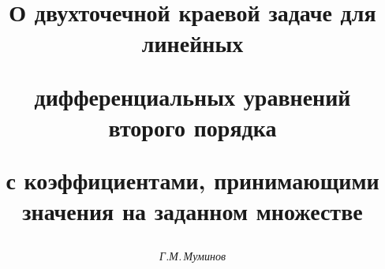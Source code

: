 

 


% 


 


\newcommand{\la}{\langle} 


\newcommand{\ra}{\rangle} 


\newcommand{\tg}{\operatorname{tg}} 


\newcommand{\arctg}{\operatorname{arctg}} 


\newcommand{\diag}{\operatorname{diag}} 


\newcommand{\tts}[1]{} 


\renewcommand{\baselinestretch}{1.03}


 




 


\setcounter{page}{44} 












 


\author{\it Г.М.\,Муминов} 




\title{О двухточечной краевой задаче для линейных 


дифференциальных уравнений второго порядка 


с коэффициентами, принимающими значения на заданном множестве} 


 


\date{} 




